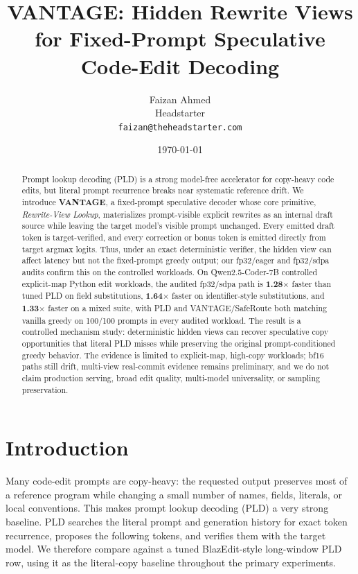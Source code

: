 \documentclass[11pt,a4paper]{article}
\title{\vspace{-1.0em}\textbf{VANTAGE: Hidden Rewrite Views for Fixed-Prompt Speculative Code-Edit Decoding}}
\author{Faizan Ahmed\\Headstarter\\\texttt{faizan@theheadstarter.com}}
\date{\today}
\begin{document}
\maketitle

\begin{abstract}
Prompt lookup decoding (PLD) is a strong model-free accelerator for
copy-heavy code edits, but literal prompt recurrence breaks near systematic
reference drift. We introduce \textbf{VANTAGE}, a fixed-prompt speculative
decoder whose core primitive, \emph{Rewrite-View Lookup}, materializes
prompt-visible explicit rewrites as an internal draft source while leaving the
target model's visible prompt unchanged. Every emitted draft token is
target-verified, and every correction or bonus token is emitted directly from
target argmax logits. Thus, under an exact deterministic verifier, the hidden
view can affect latency but not the fixed-prompt greedy output; our fp32/eager
and fp32/sdpa audits confirm this on the controlled workloads. On
Qwen2.5-Coder-7B controlled explicit-map Python edit workloads, the audited
fp32/sdpa path is
\textbf{1.28$\times$} faster than tuned PLD on field substitutions,
\textbf{1.64$\times$} faster on identifier-style substitutions, and
\textbf{1.33$\times$} faster on a mixed suite, with PLD and VANTAGE/SafeRoute
both matching vanilla greedy on 100/100 prompts in every audited workload. The
result is a controlled mechanism study: deterministic hidden views can recover
speculative copy opportunities that literal PLD misses while preserving the
original prompt-conditioned greedy behavior. The evidence is limited to
explicit-map, high-copy workloads; bf16 paths still drift, multi-view
real-commit evidence remains preliminary, and we do not claim production
serving, broad edit quality, multi-model universality, or sampling preservation.
\end{abstract}

\section{Introduction}

Many code-edit prompts are copy-heavy: the requested output preserves most of a
reference program while changing a small number of names, fields, literals, or
local conventions. This makes prompt lookup decoding (PLD) a very strong
baseline. PLD searches the literal prompt and generation history for exact token
recurrence, proposes the following tokens, and verifies them with the target
model. We therefore compare against a tuned BlazEdit-style long-window PLD row,
using it as the literal-copy baseline throughout the primary experiments.
\end{document}
